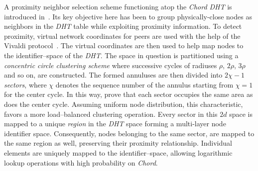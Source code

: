 
A proximity neighbor selection scheme  functioning atop 
the \emph{Chord DHT} is introduced in~\cite{DLTZZ2006}.
Its key objective here has been to group physically-close nodes as 
neighbors in the \emph{DHT} table while exploiting proximity information.
To detect proximity, virtual network coordinates for 
peers are used with the help of the Vivaldi protocol~\cite{cox_vivaldi_2004}. 
The virtual coordinates are then used to help map nodes to 
the identifier--space of the \emph{DHT}.
The space in question is partitioned using a 
\emph{concentric circle clustering scheme} where successive cycles of
radiuses $\rho$, $2\rho$, $3\rho$ and so on, are constructed. 
The formed annuluses are then divided into 
$2\chi-1$ \emph{sectors}, where $\chi$ denotes the
sequence number of the annulus starting from $\chi = 1$ 
for the center cycle. 
In this way, 
\cite{DLTZZ2006} prove that each sector
occupies the same area as does the center cycle. 
Assuming uniform node distribution, this characteristic,
favors a more load--balanced clustering operation. 
Every sector in this $2d$ space is mapped to 
a unique \emph{region} in the \emph{DHT} space forming a
multi-layer node identifier space.  
Consequently, nodes belonging to the same
sector, are mapped to the same region as well, preserving their proximity
relationship.
Individual elements
are uniquely mapped to the identifier--space, 
allowing logarithmic lookup operations with high 
probability on \emph{Chord}. 


